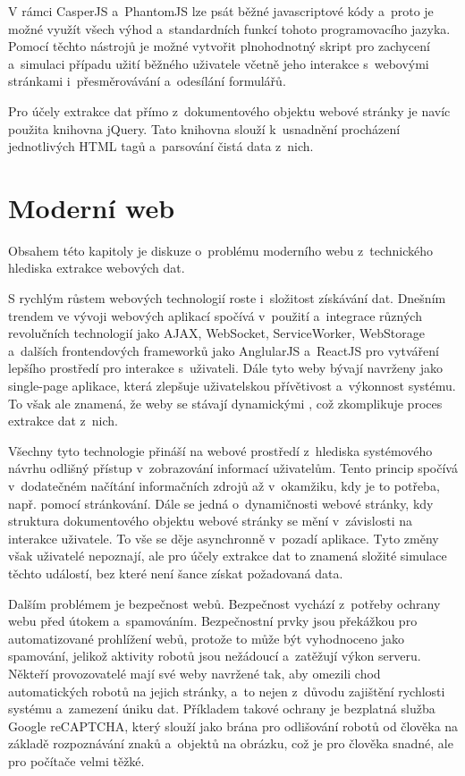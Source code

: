 \documentclass[11pt,a4paper]{article}
\begin{document}
V rámci CasperJS a~PhantomJS lze psát běžné javascriptové kódy a~proto je možné využít všech výhod a~standardních funkcí tohoto programovacího jazyka. Pomocí těchto nástrojů je možné vytvořit plnohodnotný skript pro zachycení a~simulaci případu užití běžného uživatele včetně jeho interakce s~webovými stránkami i~přesměrovávání a~odesílání formulářů.

Pro účely extrakce dat přímo z~dokumentového objektu webové stránky je navíc použita knihovna jQuery. Tato knihovna slouží k~usnadnění procházení jednotlivých HTML tagů a~parsování čistá data z~nich.


\section{Moderní web}
Obsahem této kapitoly je diskuze o~problému moderního webu z~technického hlediska extrakce webových dat.

S rychlým růstem webových technologií roste i~složitost získávání dat. Dnešním trendem ve vývoji webových aplikací spočívá v~použití a~integrace různých revolučních technologií jako AJAX, WebSocket, ServiceWorker, WebStorage a~dalších frontendových frameworků jako AnglularJS a~ReactJS pro vytváření lepšího prostředí pro interakce s~uživateli. Dále tyto weby bývají navrženy jako single-page aplikace, která zlepšuje uživatelskou přívětivost a~výkonnost systému. To však ale znamená, že weby se stávají dynamickými \cite{kelk}, což zkomplikuje proces extrakce dat z~nich.

Všechny tyto technologie přináší na webové prostředí z~hlediska systémového návrhu odlišný přístup v~zobrazování informací uživatelům. Tento princip spočívá v~dodatečném načítání informačních zdrojů až v~okamžiku, kdy je to potřeba, např. pomocí stránkování. Dále se jedná o~dynamičnosti webové stránky, kdy struktura dokumentového objektu webové stránky se mění v~závislosti na interakce uživatele. To vše se děje asynchronně v~pozadí aplikace. Tyto změny však uživatelé nepoznají, ale pro účely extrakce dat to znamená složité simulace těchto událostí, bez které není šance získat požadovaná data. 

Dalším problémem je bezpečnost webů. Bezpečnost vychází z~potřeby ochrany webu před útokem a~spamováním. Bezpečnostní prvky jsou překážkou pro automatizované prohlížení webů, protože to může být vyhodnoceno jako spamování, jelikož aktivity robotů jsou nežádoucí a~zatěžují výkon serveru. Někteří provozovatelé mají své weby navržené tak, aby omezili chod automatických robotů na jejich stránky, a~to nejen z~důvodu zajištění rychlosti systému a~zamezení úniku dat. Příkladem takové ochrany je bezplatná služba Google reCAPTCHA, který slouží jako brána pro odlišování robotů od člověka na základě rozpoznávání znaků a~objektů na obrázku, což je pro člověka snadné, ale pro počítače velmi těžké.
\end{document}

